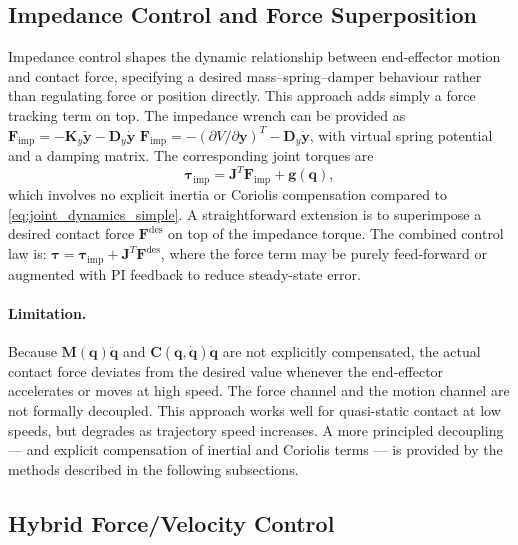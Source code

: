 \documentclass[
	german,%
	accentcolor=9c,%
	ruledheaders=section,%
	class=report,%
	thesis={type=bachelor},%
	fontsize=11pt,%
	parskip=half-,%
	custommargins=true,%
	marginpar=false,%
]{tudapub}
\begin{document}
\subsection{Impedance Control and Force Superposition}
\label{sec:impedance_control_force_superposition}

Impedance control shapes the dynamic relationship between end-effector motion
and contact force, specifying a desired mass--spring--damper behaviour rather
than regulating force or position directly. This approach adds simply a force tracking term on top. The impedance
wrench can be provided as $\mathbf{F}_{\text{imp}} = -\mathbf{K}_y\tilde{\mathbf{y}} -
\mathbf{D}_y\dot{\mathbf{y}}$ $\mathbf{F}_{\text{imp}} = -(\partial V / \partial \mathbf{y})^T -
\mathbf{D}_y\dot{\mathbf{y}}$, with virtual
spring potential and a damping matrix. The corresponding joint torques are
%
\begin{equation}
    \boldsymbol{\tau}_{\text{imp}}
    = \mathbf{J}^T\mathbf{F}_{\text{imp}} + \mathbf{g}(\mathbf{q}),
    \label{eq:tau_imp}
\end{equation}
%
which involves no explicit inertia or Coriolis compensation compared to \eqref{eq:joint_dynamics_simple}. A straightforward extension is to superimpose a desired contact force $\mathbf{F}^{\text{des}}$ on top of the
impedance torque. The combined control law is:
$\boldsymbol{\tau} = \boldsymbol{\tau}_{\text{imp}} +
\mathbf{J}^T\mathbf{F}^{\text{des}}$,
where the force term may be purely feed-forward or augmented with PI feedback
to reduce steady-state error.

\paragraph{Limitation.}
Because $\mathbf{M}(\mathbf{q})\ddot{\mathbf{q}}$ and
$\mathbf{C}(\mathbf{q},\dot{\mathbf{q}})\dot{\mathbf{q}}$ are not explicitly
compensated, the actual contact force deviates from the desired value whenever
the end-effector accelerates or moves at high speed. The force channel and
the motion channel are not formally decoupled. This approach works well for
quasi-static contact at low speeds, but degrades as trajectory speed increases.
A more principled decoupling — and explicit compensation of inertial and
Coriolis terms — is provided by the methods described in the following
subsections.

\subsection{Hybrid Force/Velocity Control}
\label{sec:hybrid_force_velocity}
\end{document}
